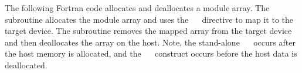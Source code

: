 
\pagebreak
The following Fortran code allocates and deallocates a module array.  The
 subroutine allocates the module array and uses the
~~ directive to map it to the target device. The
 subroutine removes the mapped array from the target device and
then deallocates the array on the host.  Note, the stand-alone 
~~ occurs after the host memory is allocated, and the 
~~ construct occurs before the host data is deallocated.


